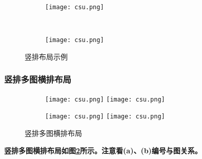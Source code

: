 \begin{figure}[!htb]
    \centering
    \begin{subfigure}[t]{0.15\linewidth}
        \begin{minipage}[b]{1\linewidth}
        \texttt{[image: csu.png]}
        \caption{}
        \end{minipage}
    \end{subfigure}\\
    \begin{subfigure}[t]{0.15\linewidth}
        \begin{minipage}[b]{1\linewidth}
        \texttt{[image: csu.png]}
        \caption{}
        \end{minipage}
    \end{subfigure}
    \caption{竖排布局示例}
    \label{F.csu_col}
\end{figure}



\subsubsection{竖排多图横排布局}

\begin{figure}[!htb]
    \centering
    \begin{subfigure}[t]{0.13\linewidth}
    	\captionsetup{justification=centering} %
        \begin{minipage}[b]{1\linewidth}
        \texttt{[image: csu.png]} \vspace{-1ex} \vfill
        \texttt{[image: csu.png]}
         \caption{}
        \end{minipage}
    \end{subfigure}
    \begin{subfigure}[t]{0.13\linewidth}
    	\captionsetup{justification=centering} %
        \begin{minipage}[b]{1\linewidth}
        \texttt{[image: csu.png]} \vspace{-1ex} \vfill
        \texttt{[image: csu.png]}
        \caption{}
        \end{minipage}
    \end{subfigure}
    \caption{竖排多图横排布局}
    \label{F.csu_col_row}
\end{figure}

\textbf{竖排多图横排布局如图\ref{F.csu_col_row}所示。注意看(a)、(b)编号与图关系。}


